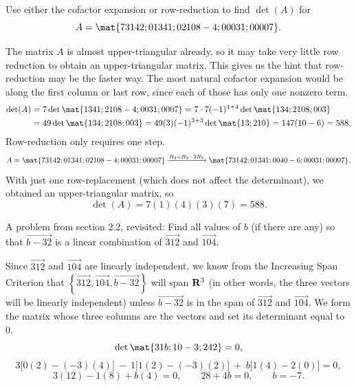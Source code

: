 \begin{problems}
\problem %
Use either the cofactor expansion or row-reduction to find $\det(A)$ for
\[A = \mat{7 3 1 4 2; 0 1 3 4 1; 0 2 10 8 -4; 0 0 0 3 1; 0 0 0 0 7}.\]
\begin{solution}
  The matrix $A$ is almost upper-triangular already, so it may take very little
  row reduction to obtain an upper-triangular matrix.  This gives us the hint
  that row-reduction may be the faster way. \newline \newline %
  The most natural cofactor expansion would be along the first column or last
  row, since each of those has only one nonzero term.  
  \begin{align*}
    \det(A) & = 7 \det\mat{1 3 4 1; 2 10 8 -4; 0 0 3 1; 0 0 0 7}
              = 7 \cdot 7(-1)^{4+4} \det\mat{1 3 4; 2 10 8; 0 0 3} \\
             &  = 49 \det\mat{1 3 4; 2 10 8; 0 0 3} 
             = 49(3)(-1)^{3+3} \det\mat{1 3; 2 10}
              = 147(10-6) = 588.
  \end{align*}
  Row-reduction only requires one step.
  \[A = 
  \mat{7 3 1 4 2; 0 1 3 4 1; 0 2 10 8 -4; 0 0 0 3 1; 0 0 0 0 7}
  \xrightarrow[]{R_3 = R_3 - 2R_2}
  \mat{7 3 1 4 2; 0 1 3 4 1; 0 0 4 0 -6; 0 0 0 3 1; 0 0 0 0 7}.
  \]
  With just one row-replacement (which does not affect the determinant),
  we obtained an upper-triangular matrix, so
  \[\det(A) = 7(1)(4)(3)(7) = 588.\]


\end{solution}

\problem %
A problem from section 2.2, revisited: Find all values of $b$ (if
there are any) so that $\vec{b -3 2}$ is a linear combination of
$\vec{3 1 2}$ and $\vec{1 0 4}$.

\begin{solution}
  Since $\vec{3 1 2}$ and $\vec{1 0 4}$ are linearly independent, we
  know from the Increasing Span Criterion that
  $\left\{ \vec{3 1 2}, \vec{1 0 4}, \vec{b -3 2}\right\}$ will span
  ${\bf R}^3$ (in other words, the three vectors will be linearly
  independent) unless $\vec{b -3 2}$ is in the span of $\vec{3 1 2}$
  and $\vec{1 0 4}$.  We form the matrix whose three columns are the
  vectors and set its determinant equal to $0$.
  \[\det\mat{3 1 b; 1 0 -3; 2 4 2} = 0,\]
  \[3\big[0(2) - (-3)(4)\big] \ - \ 1\big[1(2)-(-3)(2)\big] \ + \
    b\big[1(4)-2(0)\big] = 0,\]
  \[3(12) - 1(8) + b(4) = 0, \qquad 28+4b = 0, \qquad b = -7.\]
\end{solution}


\end{problems}
